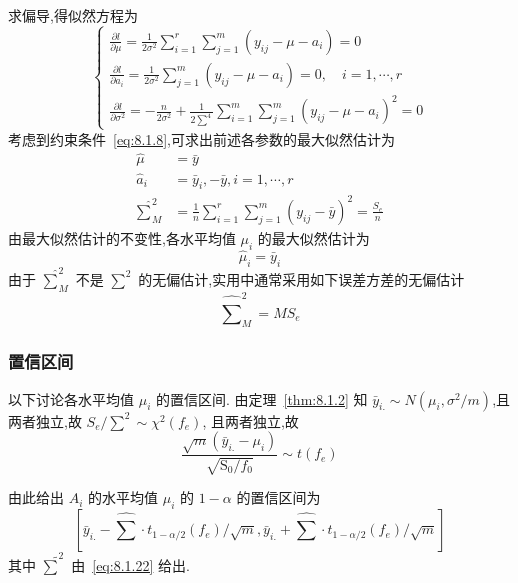 求偏导,得似然方程为
\begin{equation*}
  \begin{cases}
    \frac{\partial l}{\partial \mu} =\frac{1}{2 \sigma^{2}} \sum_{i=1}^{r} \sum_{j=1}^{m}\left(y_{i j}-\mu-a_{i}\right)=0 \\
    \frac{\partial l}{\partial a_{i}} =\frac{1}{2 \sigma^{2}} \sum_{j=1}^{m}\left(y_{i j}-\mu-a_{i}\right)=0, \quad i=1, \cdots, r\\
    \frac{\partial l}{\partial \sigma^{2}} =-\frac{n}{2 \sigma^{2}}+\frac{1}{2 \sum^{4}} \sum_{i=1}^{m} \sum_{j=1}^{m}\left(y_{i j}-\mu-a_{i}\right)^{2}=0
  \end{cases}
\end{equation*}
考虑到约束条件~\eqref{eq:8.1.8},可求出前述各参数的最大似然估计为
\begin{equation}
  \label{eq:8.1.20}
  \begin{split}
    \hat{\mu} &= \bar{y}\\
    \hat{a}_{i} & =\bar{y}_{i},-\bar{y}, i=1, \cdots, r \\
    \hat{\sum}_{M}^{2} &= \frac{1}{n} \sum_{i=1}^{r} \sum_{j=1}^{m}\left(y_{i j}-\bar{y}\right)^{2}=\frac{S_{e}}{n}
  \end{split}
\end{equation}
由最大似然估计的不变性,各水平均值 $\mu_i$ 的最大似然估计为
\begin{equation}
  \label{eq:8.1.21}
  \hat{\mu}_{i}=\bar{y}_{i}
\end{equation}
由于 $\hat{\sum}_{M}^{2}$ 不是 $\sum^2$ 的无偏估计,实用中通常采用如下误差方差的无偏估计
\begin{equation}
  \label{eq:8.1.22}
  \hat{\sum}_{M}^{2} = M S_{e}
\end{equation}

\subsubsection{置信区间}

以下讨论各水平均值 $\mu_i$ 的置信区间. 由定理~\ref{thm:8.1.2} 知 $\bar{y}_{i.} \sim N (\mu_{i}, \sigma^{2}/m)$,且两者独立,故 $S_e/\sum^2 \sim \chi^2(f_e)$, 且两者独立,故
\begin{equation*}
  \frac{\sqrt{m}\left(\bar{y}_{i.}-\mu_{i}\right)}{\sqrt{\mathrm{S}_{0} / f_{0}}} \sim t\left(f_{e}\right)
\end{equation*}

由此给出 $A_i$ 的水平均值 $\mu_i$ 的 $1-\alpha$ 的置信区间为
\begin{equation}\label{eq:8.1.23}
  \left[\bar{y}_{i.}-\hat{\sum} \cdot t_{1-\alpha / 2}(f_{e}) / \sqrt{m}, \bar{y}_{i.}+\hat{\sum} \cdot t_{1-\alpha / 2}(f_{e}) / \sqrt{m}\right]
\end{equation}
其中 $\tilde{\sum}^2$ 由~\eqref{eq:8.1.22} 给出.

